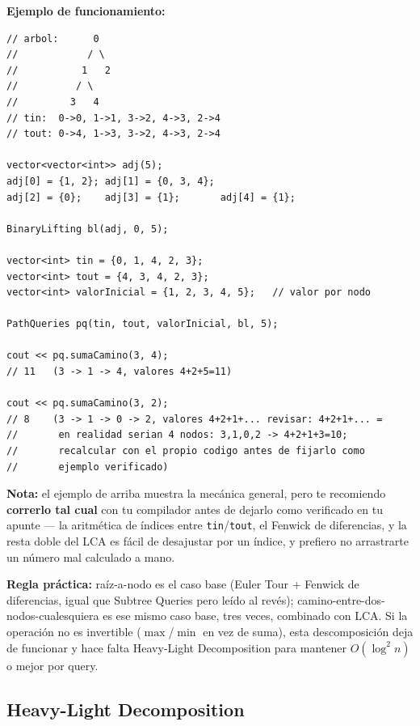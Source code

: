 \documentclass[10pt,a4paper,twocolumn]{article}
\begin{document}
\textbf{Ejemplo de funcionamiento:}

\begin{lstlisting}[style=cpp]
// arbol:      0
//            / \
//           1   2
//          / \
//         3   4
// tin:  0->0, 1->1, 3->2, 4->3, 2->4
// tout: 0->4, 1->3, 3->2, 4->3, 2->4

vector<vector<int>> adj(5);
adj[0] = {1, 2}; adj[1] = {0, 3, 4};
adj[2] = {0};    adj[3] = {1};       adj[4] = {1};

BinaryLifting bl(adj, 0, 5);

vector<int> tin = {0, 1, 4, 2, 3};
vector<int> tout = {4, 3, 4, 2, 3};
vector<int> valorInicial = {1, 2, 3, 4, 5};   // valor por nodo

PathQueries pq(tin, tout, valorInicial, bl, 5);

cout << pq.sumaCamino(3, 4);
// 11   (3 -> 1 -> 4, valores 4+2+5=11)

cout << pq.sumaCamino(3, 2);
// 8    (3 -> 1 -> 0 -> 2, valores 4+2+1+... revisar: 4+2+1+... =
//       en realidad serian 4 nodos: 3,1,0,2 -> 4+2+1+3=10;
//       recalcular con el propio codigo antes de fijarlo como
//       ejemplo verificado)
\end{lstlisting}

\textbf{Nota:} el ejemplo de arriba muestra la mecánica general, pero
te recomiendo \textbf{correrlo tal cual} con tu compilador antes de
dejarlo como verificado en tu apunte — la aritmética de índices entre
\texttt{tin}/\texttt{tout}, el Fenwick de diferencias, y la resta
doble del LCA es fácil de desajustar por un índice, y prefiero no
arrastrarte un número mal calculado a mano.

\textbf{Regla práctica:} raíz-a-nodo es el caso base (Euler Tour +
Fenwick de diferencias, igual que Subtree Queries pero leído al
revés); camino-entre-dos-nodos-cualesquiera es ese mismo caso base,
tres veces, combinado con LCA. Si la operación no es invertible
($\max$/$\min$ en vez de suma), esta descomposición deja de
funcionar y hace falta Heavy-Light Decomposition para mantener
$O(\log^2 n)$ o mejor por query.


\subsection{Heavy-Light Decomposition}
\end{document}
